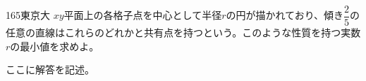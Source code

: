 \begin{thm}{165}{\maru}{東京大}
 $xy$平面上の各格子点を中心として半径$r$の円が描かれており、傾き$\dfrac{2}{5}$の任意の直線はこれらのどれかと共有点を持つという。このような性質を持つ実数$r$の最小値を求めよ。
\end{thm}

ここに解答を記述。